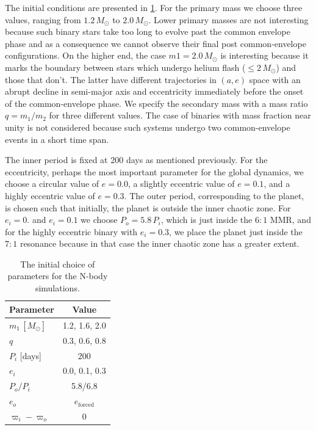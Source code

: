 \documentclass[ twoside,openright,titlepage,numbers=noenddot,headinclude,%
                footinclude=true,cleardoublepage=empty,abstractoff, %
                BCOR=5mm,paper=a4,fontsize=11pt,%
                american,%
                ]{scrreprt}
\begin{document}
The initial conditions are presented in \cref{table:initial_conditions}. For the 
primary mass we choose three values, ranging from $1.2\,M_\odot$ to $2.0\,M_\odot$.
Lower primary masses are not interesting because such binary stars take too long
to evolve past the common envelope phase and as a consequence we cannot observe
their final post common-envelope configurations. On the higher end, the case
$m1=2.0\,M_\odot$ is interesting because it marks the boundary between stars which
undergo helium flash ($\leq 2\,M_\odot$) and those that don't. The latter have
different trajectories in $(a,e)$ space with an abrupt decline in semi-major 
axis and eccentricity immediately before the onset of the common-envelope phase.
We specify the secondary mass with a mass ratio $q=m_1/m_2$ for three different 
values. The case of binaries with mass fraction near unity is not considered
because such systems undergo two common-envelope events in a short time span.

The inner period is fixed at 200 days as mentioned previously. For the 
eccentricity, perhaps the most important parameter for the global dynamics, 
we choose a circular value of $e=0.0$, a slightly eccentric value of $e=0.1$,
and a highly eccentric value of $e=0.3$. The outer period, corresponding
to the planet, is chosen such that initially, the planet is outside the 
inner chaotic zone. For $e_i=0.$ and $e_i=0.1$ we choose $P_o=5.8\,P_i$, which
is just inside the $6:1$ MMR, and for the highly eccentric binary with $e_i=0.3$,
we place the planet just inside the $7:1$ resonance because in that case the 
inner chaotic zone has a greater extent.
\begin{table}[h!]
\centering
\begin{tabular}{lc}
\toprule
    Parameter &  Value\\
\midrule
    $m_1\,[M_\odot]$ &1.2, 1.6, 2.0\\
    $q$&0.3, 0.6, 0.8\\
    $P_i$ [days]& 200\\
    $e_i$ &0.0, 0.1, 0.3\\
    $P_o/P_i$ & 5.8/6.8 \\
    $e_o$&$e_\text{forced}$\\
    $\varpi_i-\varpi_o$  & 0\\
         \bottomrule
\end{tabular}
    \caption{The initial choice of parameters for the N-body simulations.}
\label{table:initial_conditions}
\end{table}
\end{document}
